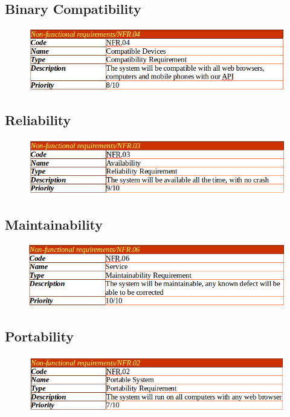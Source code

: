 \documentclass[]{article}
\begin{document}
\subsection {Binary Compatibility}

\begin{figure}[H]
\centering
\includegraphics[scale=0.4]{./nonf/02}
\end{figure}

\subsection {Reliability}

\begin{figure}[H]
\centering
\includegraphics[scale=0.4]{./nonf/03}
\end{figure}

\subsection {Maintainability}

\begin{figure}[H]
\centering
\includegraphics[scale=0.4]{./nonf/04}
\end{figure}

\subsection {Portability}

\begin{figure}[H]
\centering
\includegraphics[scale=0.4]{./nonf/05}
\end{figure}
\end{document}
